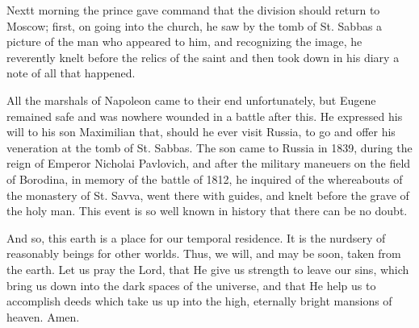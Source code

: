 Nextt morning the prince gave command that the division should return to Moscow; first, on going into the church, he saw by the tomb of St. Sabbas a picture of the man who appeared to him, and recognizing the image, he reverently knelt before the relics of the saint and then took down in his diary a note of all that happened.

All the marshals of Napoleon came to their end unfortunately, but Eugene remained safe and was nowhere wounded in a battle after this. He expressed his will to his son Maximilian that, should he ever visit Russia, to go and offer his veneration at the tomb of St. Sabbas. The son came to Russia in 1839, during the reign of Emperor Nicholai Pavlovich, and after the military maneuers on the field of Borodina, in memory of the battle of 1812, he inquired of the whereabouts of the monastery of St. Savva, went there with guides, and knelt before the grave of the holy man. This event is so well known in history that there can be no doubt.

And so, this earth is a place for our temporal residence. It is the nurdsery of reasonably beings for other worlds. Thus, we will, and may be soon, taken from the earth. Let us pray the Lord, that He give us strength to leave our sins, which bring us down into the dark spaces of the universe, and that He help us to accomplish deeds which take us up into the high, eternally bright mansions of heaven. Amen.
